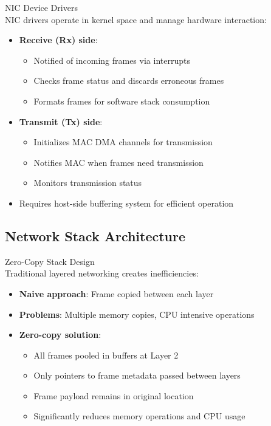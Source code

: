 \begin{definition}{NIC Device Drivers}\\
    NIC drivers operate in kernel space and manage hardware interaction:
    \begin{itemize}
        \item \textbf{Receive (Rx) side}:
            \begin{itemize}
                \item Notified of incoming frames via interrupts
                \item Checks frame status and discards erroneous frames
                \item Formats frames for software stack consumption
            \end{itemize}
        \item \textbf{Transmit (Tx) side}:
            \begin{itemize}
                \item Initializes MAC DMA channels for transmission
                \item Notifies MAC when frames need transmission
                \item Monitors transmission status
            \end{itemize}
        \item Requires host-side buffering system for efficient operation
    \end{itemize}
\end{definition}

\subsection{Network Stack Architecture}

\begin{concept}{Zero-Copy Stack Design}\\
    Traditional layered networking creates inefficiencies:
    \begin{itemize}
        \item \textbf{Naive approach}: Frame copied between each layer
        \item \textbf{Problems}: Multiple memory copies, CPU intensive operations
        \item \textbf{Zero-copy solution}:
            \begin{itemize}
                \item All frames pooled in buffers at Layer 2
                \item Only pointers to frame metadata passed between layers
                \item Frame payload remains in original location
                \item Significantly reduces memory operations and CPU usage
            \end{itemize}
    \end{itemize}
\end{concept}

